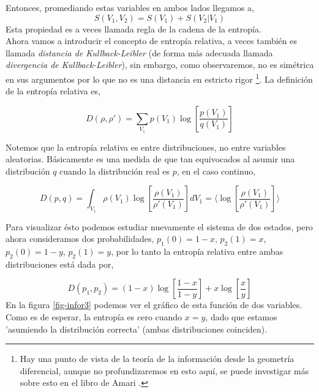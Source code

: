 \documentclass[executivepaper,12pt]{article}
\numberwithin{equation}{section}
\begin{document}
Entonces, promediando estas variables en ambos lados llegamos a,
\begin{equation*}
	S(V_1,V_2)=S(V_1)+S(V_2\rvert V_1)
\end{equation*}
Esta propiedad es a veces llamada regla de la cadena de la entropía. \\

Ahora vamos a introducir el concepto de entropía relativa, a veces también es llamada \textit{distancia de Kullback-Leibler} (de forma más adecuada llamada \textit{divergencia de Kullback-Leibler}), sin embargo, como observaremos, no es simétrica en sus argumentos por lo que no es una distancia en estricto rigor \footnote{Hay una punto de vista de la teoría de la información desde la geometría diferencial, aunque no profundizaremos en esto aquí, se puede investigar más sobre esto en el libro de Amari \parencite{amari2016}.}. La definición de la entropía relativa es,

\begin{equation*}
	D(\rho,\rho') = \sum_{V_1} p(V_1)\log\left[\frac{p(V_1)}{q(V_1)}\right]
\end{equation*} 

Notemos que la entropía relativa es entre distribuciones, no entre variables aleatorias. Básicamente es una medida de que tan equivocados al asumir una distribución $q$ cuando la distribución real es $p$, en el caso continuo,

\begin{equation*}
	D(p,q) = \int_{V_1} \rho(V_1)\log\left[\frac{\rho(V_1)}{\rho'(V_1)}\right] dV_1 = \langle
 	\log\left[\frac{\rho(V_1)}{\rho'(V_1)}\right]\rangle
\end{equation*} 

Para visualizar ésto podemos estudiar nuevamente el sistema de dos estados, pero ahora consideramos dos probabilidades, $p_1(0)=1-x$, $p_2(1)=x$, $p_2(0)=1-y$, $p_2(1)=y$, por lo tanto la entropía relativa entre ambas distribuciones está dada por,

\begin{equation*}
	D(p_1,p_2)=(1-x)\log\left[\frac{1-x}{1-y}\right]+x\log\left[\frac{x}{y}\right]
\end{equation*}
En la figura \ref{fig-infor3} podemos ver el gráfico de esta función de dos variables. Como es de esperar, la entropía es cero cuando $x=y$, dado que estamos 'asumiendo la distribución correcta' (ambas distribuciones coinciden).
\end{document}
